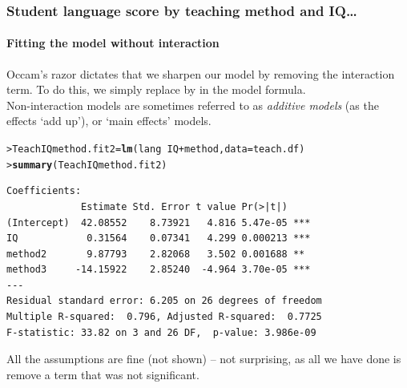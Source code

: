 \documentclass{beamer}\usepackage[]{graphicx}\usepackage[]{xcolor}
\makeatletter
\newcommand{\hlopt}[1]{\textcolor[rgb]{0,0,0}{#1}}%
\newcommand{\hlstd}[1]{\textcolor[rgb]{0.345,0.345,0.345}{#1}}%
\newcommand{\hlkwb}[1]{\textcolor[rgb]{0.69,0.353,0.396}{#1}}%
\newcommand{\hlkwc}[1]{\textcolor[rgb]{0.333,0.667,0.333}{#1}}%
\newcommand{\hlkwd}[1]{\textcolor[rgb]{0.737,0.353,0.396}{\textbf{#1}}}%
\newenvironment{kframe}{%
 \def\at@end@of@kframe{}%
 \ifinner\ifhmode%
  \def\at@end@of@kframe{\end{minipage}}%
  \begin{minipage}{\columnwidth}%
 \fi\fi%
 \def\FrameCommand##1{\hskip\@totalleftmargin \hskip-\fboxsep
 \colorbox{shadecolor}{##1}\hskip-\fboxsep
     \hskip-\linewidth \hskip-\@totalleftmargin \hskip\columnwidth}%
 \MakeFramed {\advance\hsize-\width
   \@totalleftmargin\z@ \linewidth\hsize
   \@setminipage}}%
 {\par\unskip\endMakeFramed%
 \at@end@of@kframe}
\newenvironment{knitrout}{}{} %
\makeatother
\begin{document}
\begin{frame}[fragile]
\frametitle{Student language score by  teaching method and IQ\ldots}
\framesubtitle{Fitting the model without interaction}
Occam's razor dictates that we sharpen our model by removing the interaction term.
To do this, we simply replace \rcode{*} by \rcode{+} in the model formula.\\

Non-interaction models are sometimes referred to as \emph{additive models} (as the effects `add up'),
or `main effects' models.

\begin{knitrout}\scriptsize
{}\color{fgcolor}\begin{kframe}
\begin{alltt}
\hlstd{> }\hlstd{TeachIQmethod.fit2}\hlkwb{=}\hlkwd{lm}\hlstd{(lang}\hlopt{~}\hlstd{IQ}\hlopt{+}\hlstd{method,} \hlkwc{data}\hlstd{=teach.df)}
\hlstd{> }\hlkwd{summary}\hlstd{(TeachIQmethod.fit2)}
\end{alltt}
\end{kframe}
\end{knitrout}

\begin{knitrout}\scriptsize
{}\color{fgcolor}\begin{kframe}
\begin{verbatim}
Coefficients:
             Estimate Std. Error t value Pr(>|t|)    
(Intercept)  42.08552    8.73921   4.816 5.47e-05 ***
IQ            0.31564    0.07341   4.299 0.000213 ***
method2       9.87793    2.82068   3.502 0.001688 ** 
method3     -14.15922    2.85240  -4.964 3.70e-05 ***
---
Residual standard error: 6.205 on 26 degrees of freedom
Multiple R-squared:  0.796,	Adjusted R-squared:  0.7725 
F-statistic: 33.82 on 3 and 26 DF,  p-value: 3.986e-09
\end{verbatim}
\end{kframe}
\end{knitrout}

All the assumptions are fine (not shown) -- not surprising, as all we have done is remove
a term that was not significant.
\end{frame}
\end{document}
